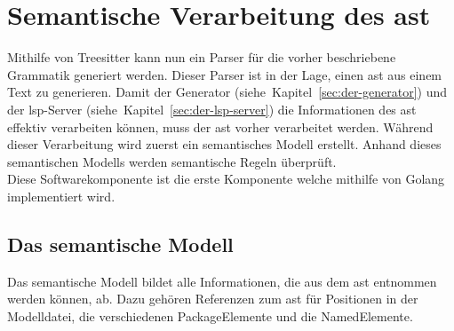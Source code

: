 \documentclass[./einleitung.tex]{subfiles}
\begin{document}
    \section{Semantische Verarbeitung des \acrfull{ast}}\label{sec:semantische-verarbeitung-des-ast}
    Mithilfe von Treesitter kann nun ein Parser für die vorher beschriebene Grammatik generiert werden.
    Dieser Parser ist in der Lage, einen \acrshort{ast} aus einem Text zu generieren.
    Damit der Generator (siehe~Kapitel~\ref{sec:der-generator}) und der \acrshort{lsp}-Server (siehe~Kapitel~\ref{sec:der-lsp-server}) die Informationen des \acrshort{ast} effektiv verarbeiten können,
    muss der \acrshort{ast} vorher verarbeitet werden.
    Während dieser Verarbeitung wird zuerst ein semantisches Modell erstellt.
    Anhand dieses semantischen Modells werden semantische Regeln überprüft.\\

    Diese Softwarekomponente ist die erste Komponente welche mithilfe von Golang implementiert wird.

    \subsection{Das semantische Modell}\label{subsec:das-semantische-modell}
    Das semantische Modell bildet alle Informationen, die aus dem \acrshort{ast} entnommen werden können, ab.
    Dazu gehören Referenzen zum \acrshort{ast} für Positionen in der Modelldatei, die verschiedenen PackageElemente und die NamedElemente.
\end{document}
